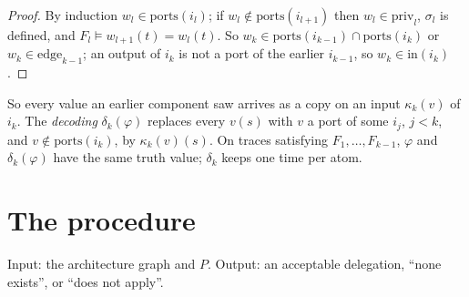 \documentclass[10pt]{article}
\theoremstyle{tplain}\newtheorem{theorem}{Theorem}\newtheorem{lemma}[theorem]{Lemma}\newtheorem{proposition}[theorem]{Proposition}\newtheorem{corollary}[theorem]{Corollary}
\theoremstyle{tdef}\newtheorem{definition}[theorem]{Definition}
\newcommand{\inp}{\mathrm{in}}\newcommand{\outp}{\mathrm{out}}\newcommand{\ports}{\mathrm{ports}}
\newcommand{\priv}{\mathrm{priv}}\newcommand{\edge}{\mathrm{edge}}
\begin{document}
\begin{proof}
By induction $w_l\in\ports(i_l)$; if $w_l\notin\ports(i_{l+1})$ then $w_l\in\priv_l$, $\sigma_l$ is defined, and $F_l\models w_{l+1}(t)=w_l(t)$. So $w_k\in\ports(i_{k-1})\cap\ports(i_k)$ or $w_k\in\edge_{k-1}$; an output of $i_k$ is not a port of the earlier $i_{k-1}$, so $w_k\in\inp(i_k)$.
\end{proof}
So every value an earlier component saw arrives as a copy on an input $\kappa_k(v)$ of $i_k$. The \emph{decoding} $\delta_k(\varphi)$ replaces every $v(s)$ with $v$ a port of some $i_j$, $j<k$, and $v\notin\ports(i_k)$, by $\kappa_k(v)(s)$. On traces satisfying $F_1,\dots,F_{k-1}$, $\varphi$ and $\delta_k(\varphi)$ have the same truth value; $\delta_k$ keeps one time per atom.

\section{The procedure}\label{sec:proc}
Input: the architecture graph and $P$. Output: an acceptable delegation, ``none exists'', or ``does not apply''.\vspace{-1pt}
\end{document}

